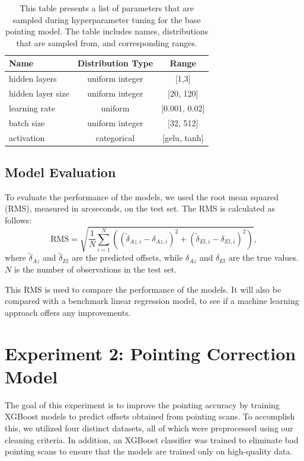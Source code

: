 \begin{table}[H]
    \centering
    \caption{This table presents a list of parameters that are sampled during hyperparameter tuning for the base pointing model. The table includes names, distributions that are sampled from, and corresponding ranges.}
    \begin{tabular}{lcc}
    \hline
    \textbf{Name} & \textbf{Distribution Type} & \textbf{Range} \\ \hline
    hidden layers & uniform integer & [1,3] \\
    hidden layer size & uniform integer & [20, 120] \\
    learning rate & uniform & [0.001, 0.02] \\
    batch size & uniform integer & [32, 512] \\
    activation & categorical & [gelu, tanh] \\ \hline
    \end{tabular}
    \label{tab:nn_hyperparameters}
    \end{table}

\subsection{Model Evaluation}
To evaluate the performance of the models, we used the root mean squared (RMS), measured in arcseconds, on the test set.
The RMS is calculated as follows:
\begin{equation}
    \text{RMS} = \sqrt{ \frac{1}{N} \sum_{i=1}^N \left( (\tilde{\delta}_{Az,i} - \delta_{Az,i})^2 + (\tilde{\delta}_{El,i} - \delta_{El,i})^2 \right)},
\end{equation}
where $\tilde{\delta}_{Az}$ and $\tilde{\delta}_{El}$ are the predicted offsets, while $\delta_{Az}$ and $\delta_{El}$ are the true values.
$N$ is the number of observations in the test set.

This RMS is used to compare the performance of the models.
It will also be compared with a benchmark linear regression model, to see if a machine learning approach offers any improvements.

\section{Experiment 2: Pointing Correction Model}
The goal of this experiment is to improve the pointing accuracy by training XGBoost models to predict offsets obtained from pointing scans.
To accomplish this, we utilized four distinct datasets, all of which were preprocessed using our cleaning criteria.
In addition, an XGBoost classifier was trained to eliminate bad pointing scans to ensure that the models are trained only on high-quality data.

